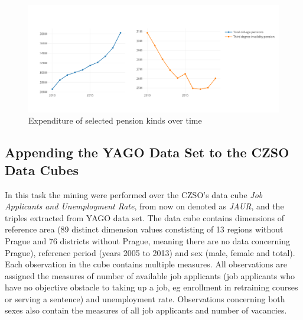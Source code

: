 \begin{figure}[h]
\centering
\includegraphics[width=\textwidth]{img/expenses.png}
\caption{Expenditure of selected pension kinds over time}
\label{qbstructureimg}
\end{figure}

\subsection{Appending the YAGO Data Set to the CZSO Data Cubes}

In this task the mining were performed over the CZSO's data cube \textit{Job Applicants and Unemployment Rate}, from now on denoted as \textit{JAUR}, and the triples extracted from YAGO data set. The data cube contains dimensions of reference area (89 distinct dimension values constisting of 13 regions without Prague and 76 districts without Prague, meaning there are no data concerning Prague), reference period (years 2005 to 2013) and sex (male, female and total). Each observation in the cube contains multiple measures. All observations are assigned the measures of number of available job applicants (job applicants who have no objective obstacle to taking up a job, eg enrollment in retraining courses or serving a sentence) and unemployment rate. Observations concerning both sexes also contain the measures of all job applicants and number of vacancies.


